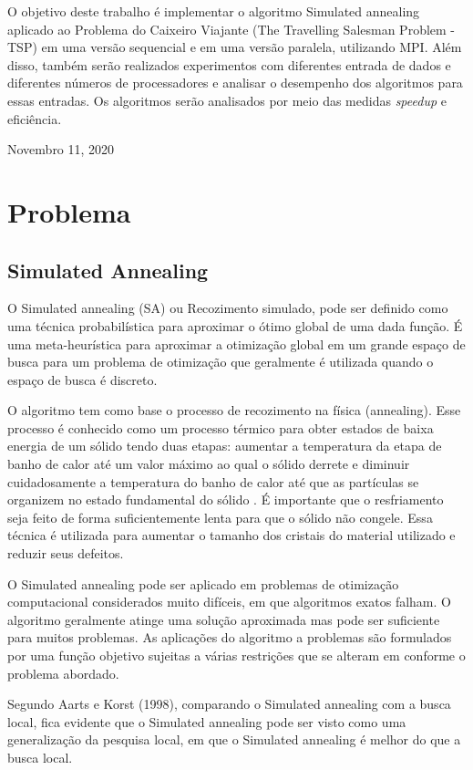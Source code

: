 \documentclass[journal]{IEEEtran}
\begin{document}
O objetivo deste trabalho é implementar o algoritmo Simulated annealing aplicado ao Problema do Caixeiro Viajante (The Travelling Salesman Problem - TSP) em uma versão sequencial e em uma versão paralela, utilizando MPI. Além disso, também serão realizados experimentos com diferentes entrada de dados e diferentes números de processadores  e  analisar o desempenho dos algoritmos para essas entradas. Os algoritmos serão analisados por meio das medidas  \textit{speedup} e eficiência. 


 
\hfill Novembro 11, 2020



\section{Problema}
\label{problema}
\subsection{Simulated Annealing}
O Simulated annealing (SA) ou Recozimento simulado, pode ser definido como uma técnica probabilística para aproximar o ótimo global de uma dada função. É uma meta-heurística para aproximar a otimização global em um grande espaço de busca para um problema de otimização que geralmente é utilizada quando o espaço de busca é discreto. 

O  algoritmo tem como base o processo de recozimento na física (annealing). Esse processo é conhecido como um processo térmico para obter estados de baixa energia de um sólido tendo duas etapas: aumentar a temperatura da etapa de banho de calor até um valor máximo ao qual o sólido derrete e diminuir cuidadosamente a temperatura do banho de calor até que as partículas se organizem no estado fundamental do sólido \cite{AARTS}. É importante que o resfriamento seja feito de forma suficientemente lenta para que o sólido não congele. Essa técnica é utilizada para aumentar o tamanho dos cristais do material utilizado e reduzir seus defeitos. 

O Simulated annealing pode ser aplicado em problemas de otimização computacional considerados muito difíceis, em que algoritmos exatos falham. O algoritmo geralmente atinge uma solução aproximada mas pode ser suficiente para muitos problemas. As aplicações do algoritmo a problemas são formulados por uma função objetivo sujeitas a várias restrições que se alteram em conforme o problema abordado. 

Segundo Aarts e Korst (1998), comparando o Simulated annealing  com a busca local, fica evidente que o Simulated annealing pode ser visto como uma generalização da pesquisa local, em que o Simulated annealing é melhor do que a busca local.
\end{document}
